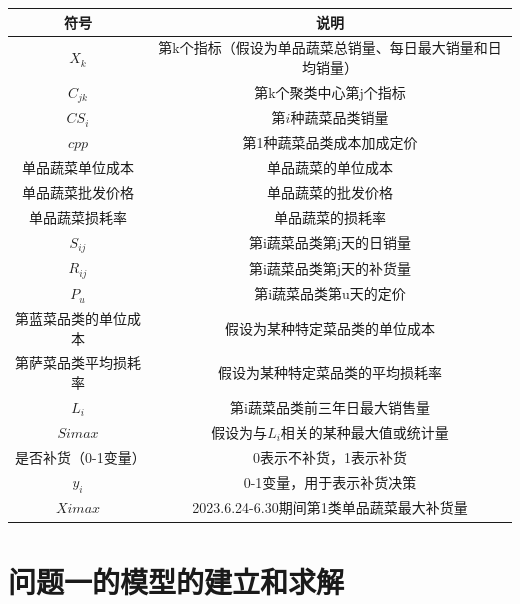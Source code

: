 \documentclass[withoutpreface]{njtechmcmthesis}
\begin{document}
\begin{table}[]  
\centering
\begin{tabular}{cc}  
\toprule
\textbf{符号} & \textbf{说明} \\ \midrule 
$X_k$ & 第k个指标（假设为单品蔬菜总销量、每日最大销量和日均销量） \\   
$C_{jk}$ & 第k个聚类中心第j个指标 \\   
$CS_i$ & 第$i$种蔬菜品类销量 \\   
$cpp$ & 第1种蔬菜品类成本加成定价 \\  
单品蔬菜单位成本 & 单品蔬菜的单位成本 \\  
单品蔬菜批发价格 & 单品蔬菜的批发价格 \\  
单品蔬菜损耗率 & 单品蔬菜的损耗率 \\   
$S_{ij}$ & 第i蔬菜品类第j天的日销量 \\   
$R_{ij}$ & 第i蔬菜品类第j天的补货量 \\   
$P_u$ & 第i蔬菜品类第u天的定价 \\   
第蓝菜品类的单位成本 & 假设为某种特定菜品类的单位成本 \\  
第萨菜品类平均损耗率 & 假设为某种特定菜品类的平均损耗率 \\   
$L_i$ & 第i蔬菜品类前三年日最大销售量 \\  
$Simax$ & 假设为与$L_i$相关的某种最大值或统计量 \\   
是否补货（0-1变量） & 0表示不补货，1表示补货 \\   
$y_i$ & 0-1变量，用于表示补货决策 \\  
$Ximax$ & 2023.6.24-6.30期间第1类单品蔬菜最大补货量 \\ \bottomrule  
\end{tabular}  
\end{table}


\section{问题一的模型的建立和求解}
\end{document}
